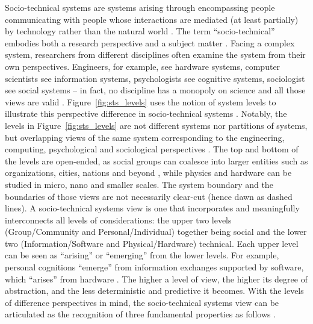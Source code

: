 Socio-technical systems are systems arising through encompassing people communicating with people whose interactions are mediated (at least partially) by technology rather than the natural world \cite{Whitworth2009}.
The term ``socio-technical'' embodies both a research perspective and a subject matter \cite{Lee2001}. Facing a complex system, researchers from different disciplines often examine the system from their own perspectives. Engineers, for example, see hardware systems, computer scientists see information systems, psychologists see cognitive systems, sociologist see social systems -- in fact, no discipline has a monopoly on science and all those views are valid \cite{Whitworth2013}. 
Figure~\ref{fig:sts_levels} uses the notion of system levels to illustrate this perspective difference in socio-technical systems \cite{Whitworth2009,Whitworth2013}. Notably, the levels in Figure~\ref{fig:sts_levels} are not different systems nor partitions of systems, but overlapping views of the same system corresponding to the engineering, computing, psychological and sociological perspectives \cite{Whitworth2009}. The top and bottom of the levels are open-ended, 
as social groups can coalesce into larger entities such as organizations, cities, nations and beyond \cite{Whitworth2009a}, while physics and hardware can be studied in micro, nano and smaller scales. The system boundary and the boundaries of those views are not necessarily clear-cut (hence dawn as dashed lines). A socio-technical systems view is one that incorporates and meaningfully interconnects all levels of considerations: the upper two levels (Group/Community and Personal/Individual) together being social and the lower two (Information/Software and Physical/Hardware) technical. Each upper level can be seen as   ``arising'' or ``emerging'' from the lower levels. For example, personal cognitions ``emerge'' from information exchanges supported by software, which ``arises'' from hardware \cite{Whitworth2009}. The higher a level of view, the higher its degree of abstraction, and the less deterministic and predictive it becomes.  
% 
With the levels of difference perspectives in mind, the socio-technical systems view can be articulated as the recognition of three fundamental properties as follows \cite{Sawyer2014}. 
%
%
